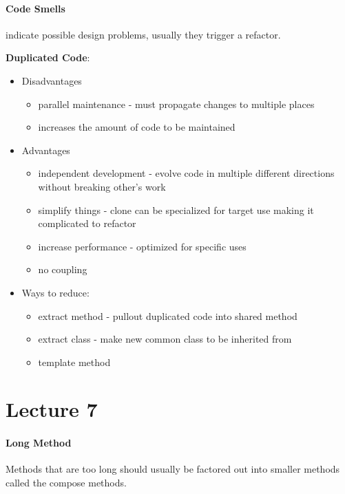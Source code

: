 \documentclass{article}
\begin{document}
\paragraph{Code Smells} %
\label{par:code_smells}
indicate possible design problems, usually they trigger a refactor.

\textbf{Duplicated Code}:
\begin{itemize}
    \item Disadvantages
    \begin{itemize}
        \item parallel maintenance - must propagate changes to multiple places
        \item increases the amount of code to be maintained
    \end{itemize}
    \item Advantages
    \begin{itemize}
        \item independent development - evolve code in multiple different directions without breaking other's work
        \item simplify things - clone can be specialized for target use making it complicated to refactor
        \item increase performance - optimized for specific uses
        \item no coupling
    \end{itemize}
    \item Ways to reduce:
    \begin{itemize}
        \item extract method - pullout duplicated code into shared method
        \item extract class - make new common class to be inherited from
        \item template method
    \end{itemize}
\end{itemize}


\section*{Lecture 7} %
\label{sec:lecture_7}

\paragraph{Long Method} %
\label{par:long_method}
Methods that are too long should usually be factored out into smaller methods called the compose methods.
\end{document}
